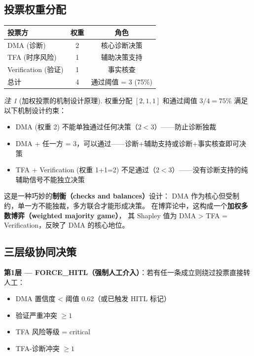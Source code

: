 \documentclass[11pt,a4paper]{ctexart}
\theoremstyle{remark}
\newtheorem{remark}{注}[section]
\begin{document}
\subsection{投票权重分配}

\begin{table}[H]
\centering
\begin{tabular}{lcc}
\toprule
\textbf{投票方} & \textbf{权重} & \textbf{角色} \\
\midrule
DMA (诊断) & 2 & 核心诊断决策 \\
TFA (时序风险) & 1 & 辅助决策支持 \\
Verification (验证) & 1 & 事实核查 \\
\midrule
总计 & 4 & 通过阈值 = 3 (75\%) \\
\bottomrule
\end{tabular}
\end{table}

\begin{remark}[加权投票的机制设计原理]
权重分配 $[2, 1, 1]$ 和通过阈值 $3/4 = 75\%$ 满足以下机制设计约束：
\begin{itemize}[nosep]
\item DMA (权重 2) 不能单独通过任何决策（$2 < 3$）——防止诊断独裁
\item DMA + 任一方 = 3，可以通过——诊断+辅助支持或诊断+事实核查即可决策
\item TFA + Verification (权重 1+1=2) 不足通过（$2 < 3$）——没有诊断支持的纯辅助信号不能独立决策
\end{itemize}
这是一种巧妙的\textbf{制衡（checks and balances）}设计：
DMA 作为核心但受制约，单一方不能独裁，多方联合才能形成决策。
在博弈论中，这构成一个\textbf{加权多数博弈（weighted majority game）}，
其 Shapley 值为 DMA > TFA = Verification，反映了 DMA 的核心地位。
\end{remark}

\subsection{三层级协同决策}

\textbf{第1层 — FORCE\_HITL（强制人工介入）}：若有任一条成立则绕过投票直接转人工：
\begin{itemize}[nosep]
\item DMA 置信度 < 阈值 0.62（或已触发 HITL 标记）
\item 验证严重冲突 $\geq 1$
\item TFA 风险等级 = critical
\item TFA-诊断冲突 $\geq 1$
\end{itemize}
\end{document}
